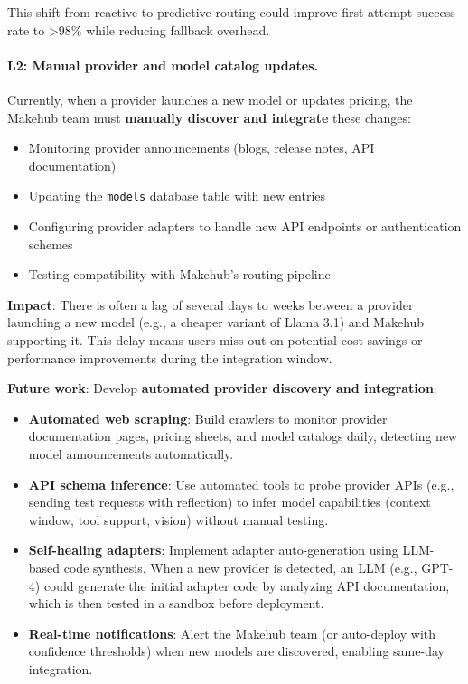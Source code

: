 \documentclass[english]{article}
\begin{document}
This shift from reactive to predictive routing could improve first-attempt success rate to >98\% while reducing fallback overhead.

\paragraph{L2: Manual provider and model catalog updates.}

Currently, when a provider launches a new model or updates pricing, the Makehub team must \textbf{manually discover and integrate} these changes:
\begin{itemize}
    \item Monitoring provider announcements (blogs, release notes, API documentation)
    \item Updating the \texttt{models} database table with new entries
    \item Configuring provider adapters to handle new API endpoints or authentication schemes
    \item Testing compatibility with Makehub's routing pipeline
\end{itemize}

\textbf{Impact}: There is often a lag of several days to weeks between a provider launching a new model (e.g., a cheaper variant of Llama 3.1) and Makehub supporting it. This delay means users miss out on potential cost savings or performance improvements during the integration window.

\textbf{Future work}: Develop \textbf{automated provider discovery and integration}:
\begin{itemize}
    \item \textbf{Automated web scraping}: Build crawlers to monitor provider documentation pages, pricing sheets, and model catalogs daily, detecting new model announcements automatically.
    \item \textbf{API schema inference}: Use automated tools to probe provider APIs (e.g., sending test requests with reflection) to infer model capabilities (context window, tool support, vision) without manual testing.
    \item \textbf{Self-healing adapters}: Implement adapter auto-generation using LLM-based code synthesis. When a new provider is detected, an LLM (e.g., GPT-4) could generate the initial adapter code by analyzing API documentation, which is then tested in a sandbox before deployment.
    \item \textbf{Real-time notifications}: Alert the Makehub team (or auto-deploy with confidence thresholds) when new models are discovered, enabling same-day integration.
\end{itemize}
\end{document}
